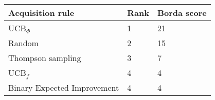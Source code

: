 \begin{tabular}{lll}
Acquisition rule & Rank & Borda score \\ 
\hline 
UCB$_\Phi$                                    & 1 & 21 \\ 
Random                                        & 2 & 15 \\ 
Thompson sampling                             & 3 & 7 \\ 
UCB$_f$ \citep{Tesch2013}                     & 4 & 4 \\ 
Binary Expected Improvement \citep{Tesch2013} & 4 & 4 \\ 
\hline 
\end{tabular}